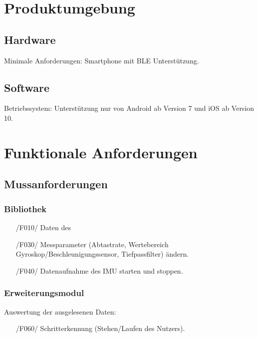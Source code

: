 \documentclass[a4paper,12pt]{article}
\begin{document}
\section{Produktumgebung}
\subsection{Hardware} \textsf{Minimale Anforderungen:} Smartphone mit \Gls{BLE} Unterstützung.
\subsection{Software} \textsf{Betriebssystem:} Unterstützung nur von Android ab Version 7 und iOS ab Version 10.

\section{Funktionale Anforderungen}
  \subsection{Mussanforderungen}
    \subsubsection{Bibliothek}
    \begin{itemize}
      \item[/F010/] Daten des %
      \item[/F030/] Messparameter (Abtastrate, Wertebereich Gyroskop/Beschleunigungssensor, Tiefpassfilter) ändern. 
      \item[/F040/] Datenaufnahme des IMU starten und stoppen.
    \end{itemize}
    \subsubsection{Erweiterungsmodul}
     Auswertung der ausgelesenen Daten:
     \begin{itemize}
      \item[/F060/] Schritterkennung (Stehen/Laufen des Nutzers).
    \end{itemize}
\end{document}
